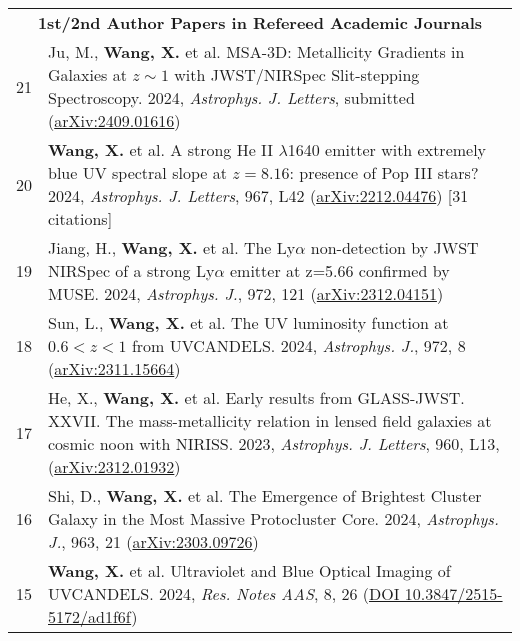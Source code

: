 \documentclass[letterpaper,10pt]{article}
\begin{document}
\begingroup
\renewcommand\arraystretch{1.2}
\vspace*{-.5em}
\begin{longtable}{rp{6.3in}}

\multicolumn{2}{c}{\textbf{1st/2nd Author Papers in Refereed Academic Journals}}      \\

21 & Ju, M., \textbf{Wang, X.} et al. MSA-3D: Metallicity Gradients in Galaxies at $z\sim1$ with JWST/NIRSpec Slit-stepping Spectroscopy. 2024, \textit{Astrophys. J. Letters}, submitted (\href{https://arxiv.org/abs/2409.01616}{arXiv:2409.01616}) \\

20 &  \textbf{Wang, X.} et al. A strong He II $\lambda$1640 emitter with extremely blue UV spectral slope at $z=8.16$: presence of Pop III stars? 2024, \textit{Astrophys. J. Letters}, 967, L42 (\href{https://arxiv.org/abs/2212.04476}{arXiv:2212.04476}) [31 citations]  \\

19 & Jiang, H., \textbf{Wang, X.} et al. The Ly$\alpha$ non-detection by JWST NIRSpec of a strong Ly$\alpha$ emitter at z=5.66 confirmed by MUSE. 2024, \textit{Astrophys. J.}, 972, 121 (\href{https://arxiv.org/abs/2312.04151}{arXiv:2312.04151}) \\

18 & Sun, L., \textbf{Wang, X.} et al. The UV luminosity function at $0.6 < z < 1$ from UVCANDELS. 2024, \textit{Astrophys. J.}, 972, 8 (\href{https://arxiv.org/abs/2311.15664}{arXiv:2311.15664}) \\

17 & He, X., \textbf{Wang, X.} et al. Early results from GLASS-JWST. XXVII. The mass-metallicity relation in lensed field galaxies at cosmic noon with NIRISS. 2023, \textit{Astrophys. J. Letters}, 960, L13, (\href{https://arxiv.org/abs/2312.01932}{arXiv:2312.01932}) \\

16 & Shi, D., \textbf{Wang, X.} et al. The Emergence of Brightest Cluster Galaxy in the Most Massive Protocluster Core. 2024, \textit{Astrophys. J.}, 963, 21 (\href{https://arxiv.org/abs/2303.09726}{arXiv:2303.09726}) \\

15 &  \textbf{Wang, X.} et al. Ultraviolet and Blue Optical Imaging of UVCANDELS. 2024, \textit{Res. Notes AAS}, 8, 26 (\href{https://iopscience.iop.org/article/10.3847/2515-5172/ad1f6f}{DOI 10.3847/2515-5172/ad1f6f})  \\


\end{longtable}
\end{document}
